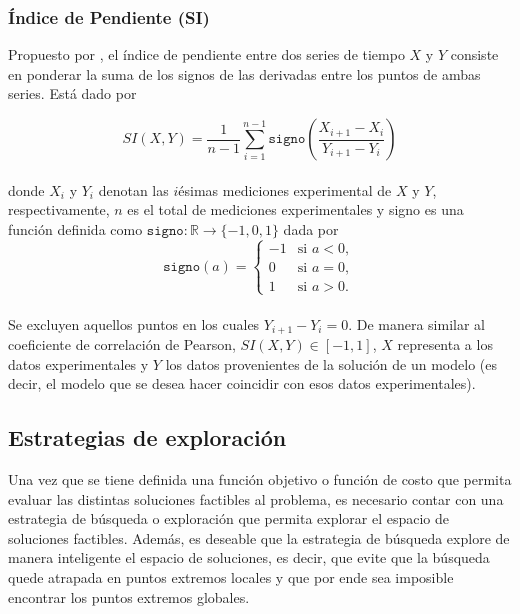 \subsubsection{Índice de Pendiente (SI)}\label{slopeIndex}

Propuesto por \citeauthor{Cho2006} \citep{Cho2006}, el índice de pendiente entre dos series de tiempo $X$ y $Y$ consiste en ponderar la suma de los signos de las derivadas entre los puntos de ambas series. Está dado por 

\begin{equation}\label{siEQ}
SI(X,Y) = \frac{1}{n - 1} \sum_{i=1}^{n-1} \mathtt{signo} \left(\frac{X_{i+1} - X_i} {Y_{i+1} - Y_i}\right)
\end{equation}
\\
donde $X_i$ y $Y_i$ denotan las $i$ésimas mediciones experimental de $X$ y $Y$, respectivamente, $n$ es el total de mediciones experimentales y signo es una función  definida como $\mathtt{signo}: \mathbb{R} \rightarrow \{ -1,0,1 \} $ dada por
\begin{equation*}
  \mathtt{signo}(a) = \left\{
    \begin{array}{rl}
      -1 & \text{si } a < 0,\\
      0 & \text{si } a = 0,\\
      1 & \text{si } a > 0.
    \end{array} \right.
\end{equation*}
\\
Se excluyen aquellos puntos en los cuales $Y_{i+1} - Y_i = 0$. De manera similar al coeficiente de correlación de Pearson, $SI(X,Y)\in [-1, 1]$, $X$ representa a los datos experimentales y $Y$ los datos provenientes de la solución de un modelo (es decir, el modelo que se desea hacer coincidir con esos datos experimentales).

\subsection{Estrategias de exploración}

Una vez que se tiene definida una función objetivo o función de costo que permita evaluar las distintas soluciones factibles al problema, es necesario contar con una estrategia de búsqueda o exploración que permita explorar el espacio de soluciones factibles. Además, es deseable que la estrategia de búsqueda explore de manera inteligente el espacio de soluciones, es decir, que evite que la búsqueda quede atrapada en puntos extremos locales y que por ende sea imposible encontrar los puntos extremos globales.

